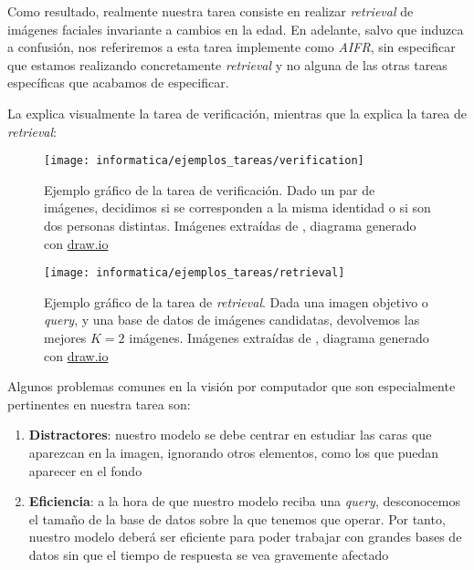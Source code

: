 Como resultado, realmente nuestra tarea consiste en realizar \textit{retrieval} de imágenes faciales invariante a cambios en la edad. En adelante, salvo que induzca a confusión, nos referiremos a esta tarea implemente como \textit{AIFR}, sin especificar que estamos realizando concretamente \textit{retrieval} y no alguna de las otras tareas específicas que acabamos de especificar.

La  explica visualmente la tarea de verificación, mientras que la  explica la tarea de \textit{retrieval}:

\begin{figure}[H]
	\centering
	\texttt{[image: informatica/ejemplos\_tareas/verification]}
	\caption{Ejemplo gráfico de la tarea de verificación. Dado un par de imágenes, decidimos si se corresponden a la misma identidad o si son dos personas distintas. Imágenes extraídas de \cite{informatica:cacd_dataset}, diagrama generado con \url{draw.io}}
	\label{img:ejemplo_verificacion}
\end{figure}

\begin{figure}[H]
	\centering
	\texttt{[image: informatica/ejemplos\_tareas/retrieval]}
	\caption{Ejemplo gráfico de la tarea de \textit{retrieval}. Dada una imagen objetivo o \textit{query}, y una base de datos de imágenes candidatas, devolvemos las mejores $K = 2$ imágenes. Imágenes extraídas de \cite{informatica:cacd_dataset}, diagrama generado con \url{draw.io}}
	\label{img:ejemplo_retrieval}
\end{figure}

Algunos problemas comunes en la visión por computador que son especialmente pertinentes en nuestra tarea son:

\begin{enumerate}
	\item \textbf{Distractores}: nuestro modelo se debe centrar en estudiar las caras que aparezcan en la imagen, ignorando otros elementos, como los que puedan aparecer en el fondo
	\item \textbf{Eficiencia}: a la hora de que nuestro modelo reciba una \textit{query}, desconocemos el tamaño de la base de datos sobre la que tenemos que operar. Por tanto, nuestro modelo deberá ser eficiente para poder trabajar con grandes bases de datos sin que el tiempo de respuesta se vea gravemente afectado
\end{enumerate}

